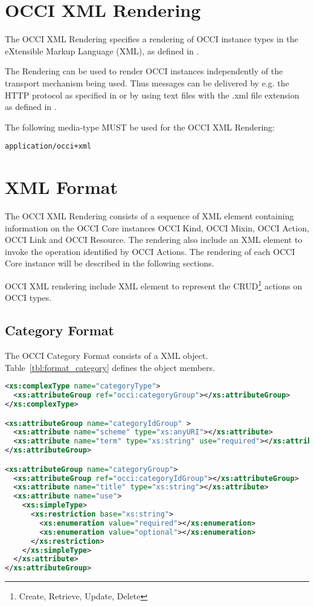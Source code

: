 \documentclass[10pt,a4paper]{article}
\begin{document}
\section{OCCI XML Rendering}

The OCCI XML Rendering specifies a rendering of OCCI instance types in
the eXtensible Markup Language (XML), as defined in \cite{w3c:xml11}.

The Rendering can be used to render OCCI instances independently of the
transport mechanism being used. Thus messages can be delivered by e.g. the HTTP
protocol as specified in \cite{occi:http_rendering} or by using text files with
the .xml file extension as defined in \cite{w3c:xml11}.

The following media-type MUST be used for the OCCI XML Rendering:

{\tt application/occi+xml}

\section{XML Format}
\label{sec:xml_format}

The OCCI XML Rendering consists of a sequence of XML element containing
information on the OCCI Core instances OCCI Kind, OCCI Mixin, OCCI
Action, OCCI Link and OCCI Resource. The rendering also include an XML
element to invoke the operation identified by OCCI Actions.
The rendering of each OCCI Core instance will be described in the
following sections.


OCCI XML rendering include XML element to represent the
CRUD\footnote{Create, Retrieve, Update, Delete} actions on OCCI types.

\subsection{Category Format}
\label{sec:format_category}
The OCCI Category Format consists of a XML object.
Table~\ref{tbl:format_category} defines the object members.

\begin{lstlisting}[language=xml]
<xs:complexType name="categoryType">	
  <xs:attributeGroup ref="occi:categoryGroup"></xs:attributeGroup>
</xs:complexType>

<xs:attributeGroup name="categoryIdGroup" >
  <xs:attribute name="scheme" type="xs:anyURI"></xs:attribute>
  <xs:attribute name="term" type="xs:string" use="required"></xs:attribute>
</xs:attributeGroup>

<xs:attributeGroup name="categoryGroup">	
  <xs:attributeGroup ref="occi:categoryIdGroup"></xs:attributeGroup>
  <xs:attribute name="title" type="xs:string"></xs:attribute>
  <xs:attribute name="use">
    <xs:simpleType>
      <xs:restriction base="xs:string">
        <xs:enumeration value="required"></xs:enumeration>
        <xs:enumeration value="optional"></xs:enumeration>
      </xs:restriction>
    </xs:simpleType>
  </xs:attribute>
</xs:attributeGroup>
\end{lstlisting}
\end{document}
